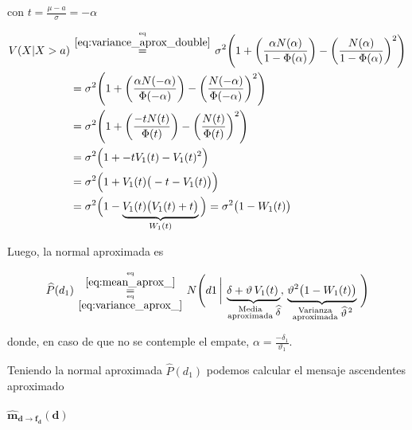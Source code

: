 \documentclass[article]{jss}
\newcommand\hfrac[2]{\genfrac{}{}{0pt}{}{#1}{#2}} %
\begin{document}
\begin{appendix}
con $t = \frac{\mu -a}{\sigma} = -\alpha  $

\begin{equation}\label{eq:variance_aprox_}
\begin{split}
 V(X|  X > a) & \overset{\hfrac{\text{eq}}{\ref{eq:variance_aprox_double}}}{=} \sigma^2 \Bigg( 1 + \bigg(\frac{\alpha N(\alpha)}{1 - \Phi(\alpha) }\bigg) - \bigg(\frac{N(\alpha)}{1 - \Phi(\alpha) }\bigg)^2 \Bigg) \\
 & = \sigma^2 \Bigg( 1 + \bigg(\frac{\alpha N(-\alpha)}{\Phi(-\alpha) }\bigg) - \bigg(\frac{N(-\alpha)}{\Phi(-\alpha) }\bigg)^2 \Bigg) \\
 & = \sigma^2 \Bigg( 1 + \bigg(\frac{-t N(t)}{\Phi(t) }\bigg) - \bigg(\frac{N(t)}{\Phi(t) }\bigg)^2 \Bigg) \\
 & = \sigma^2 \Big( 1 +  -t V_1(t) - V_1(t)^2 \Big) \\
 & = \sigma^2 \Big( 1 + V_1(t) \big(-t  - V_1(t)\big) \Big)  \\
 & = \sigma^2 \Big( 1 - \underbrace{V_1(t) \big(V_1(t) + t \big)}_{W_1(t)} \Big)  = \sigma^2 \big( 1 - W_1(t) \big)
 \end{split}
\end{equation}

Luego, la normal aproximada es

\begin{equation}\label{eq:p*_d}
 \widehat{P}(d_1) \overset{\hfrac{\text{eq}}{\ref{eq:mean_aprox_}}}{\underset{\hfrac{\text{eq}}{\ref{eq:variance_aprox_}}}{=}} N\Bigg(d1 \,  \bigg| \, \underbrace{ \delta + \vartheta \, V_1(t) \,}_{\hfrac{\text{\scriptsize Media}}{\text{\scriptsize aproximada}} \, \text{\small $\widehat{\delta}$}} , \,  \underbrace{ \vartheta^2 \big( 1 - W_1(t) \big) }_{\hfrac{\text{\scriptsize Varianza}}{\text{\scriptsize aproximada}} \,\text{\small $\widehat{\vartheta}^{\,2}$}} \, \Bigg)
\end{equation}

donde, en caso de que no se contemple el empate, $\alpha=\frac{-\delta_1}{\vartheta_1}$.

Teniendo la normal aproximada $\widehat{P}(d_1)$ podemos calcular el mensaje ascendentes aproximado

\paragraph{$\bm{\widehat{m}_{d \rightarrow f_{d}}(d)}$}


\end{appendix}
\end{document}
